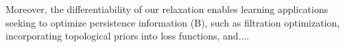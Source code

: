 \documentclass[10pt]{article}
\numberwithin{equation}{section}
\newcommand*\boxAppOne[2][Application \#1: Vectorizing persistence information]{%
  \sbox{\mysaveboxM}{#2}%
  \sbox{\mysaveboxT}{\fcolorbox{black}{white}{#1}}%
  \sbox{\mysaveboxM}{%
    \parbox[t][\ht\mysaveboxM+.5\ht\mysaveboxT+.5\dp\mysaveboxT][b]{\wd\mysaveboxM}{#2}%
  }%
  \sbox{\mysaveboxM}{%
    \fcolorbox{black}{shadecolor}{%
      \makebox[\linewidth-1em]{\usebox{\mysaveboxM}}%
    }%
  }%
  \usebox{\mysaveboxM}%
  \makebox[15pt][r]{%
    \makebox[\wd\mysaveboxM][l]{%
      \raisebox{\ht\mysaveboxM-0.5\ht\mysaveboxT+0.5\dp\mysaveboxT-0.5\fboxrule}{\usebox{\mysaveboxT}}%
    }%
  }%
}
\newcommand{\+}{%
	\raisebox{0.18ex}{\scaleobj{0.55}{+}}
}
\theoremstyle{definition}
\theoremstyle{definition}
\begin{document}
Moreover, the differentiability of our relaxation enables learning applications seeking to optimize persistence information (B), such as filtration optimization, incorporating topological priors into loss functions, and....
\\
\\
\end{document}
